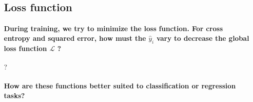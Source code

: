 \documentclass{article}
\theoremstyle{plain}%
\theoremstyle{definition}
\theoremstyle{remark}
\begin{document}
\subsection{Loss function}
\paragraph{During training, we try to minimize the loss function. For cross entropy and squared error, how must the $ \hat{y}_i $  vary to decrease the global loss function $ \mathcal{L} $ ?}
?

\paragraph{How are these functions better suited to classification or regression tasks?}
\end{document}
